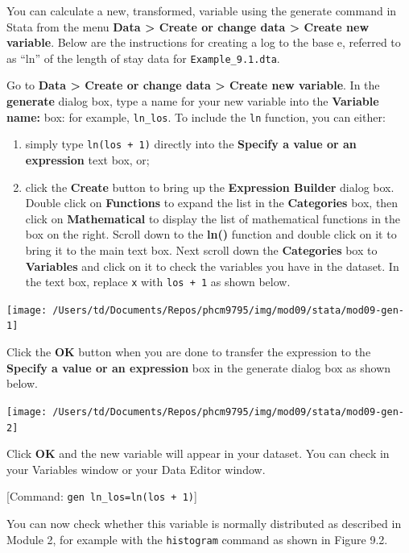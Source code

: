 \documentclass[
]{memoir}
\providecommand{\tightlist}{%
  \setlength{\itemsep}{0pt}\setlength{\parskip}{0pt}}
\begin{document}
You can calculate a new, transformed, variable using the generate command in Stata from the menu \textbf{Data \textgreater{} Create or change data \textgreater{} Create new variable}. Below are the instructions for creating a log to the base e, referred to as ``ln'' of the length of stay data for \texttt{Example\_9.1.dta}.

Go to \textbf{Data \textgreater{} Create or change data \textgreater{} Create new variable}. In the \textbf{generate} dialog box, type a name for your new variable into the \textbf{Variable name:} box: for example, \texttt{ln\_los}. To include the \texttt{ln} function, you can either:

\begin{enumerate}
\def\labelenumi{\arabic{enumi})}
\tightlist
\item
  simply type \texttt{ln(los\ +\ 1)} directly into the \textbf{Specify a value or an expression} text box, or;
\item
  click the \textbf{Create} button to bring up the \textbf{Expression Builder} dialog box. Double click on \textbf{Functions} to expand the list in the \textbf{Categories} box, then click on \textbf{Mathematical} to display the list of mathematical functions in the box on the right. Scroll down to the \textbf{ln()} function and double click on it to bring it to the main text box. Next scroll down the \textbf{Categories} box to \textbf{Variables} and click on it to check the variables you have in the dataset. In the text box, replace \texttt{x} with \texttt{los\ +\ 1} as shown below.
\end{enumerate}

\texttt{[image: /Users/td/Documents/Repos/phcm9795/img/mod09/stata/mod09-gen-1]}

Click the \textbf{OK} button when you are done to transfer the expression to the \textbf{Specify a value or an expression} box in the generate dialog box as shown below.

\texttt{[image: /Users/td/Documents/Repos/phcm9795/img/mod09/stata/mod09-gen-2]}

Click \textbf{OK} and the new variable will appear in your dataset. You can check in your Variables window or your Data Editor window.

{[}Command: \texttt{gen\ ln\_los=ln(los\ +\ 1)}{]}

You can now check whether this variable is normally distributed as described in Module 2, for example with the \texttt{histogram} command as shown in Figure 9.2.
\end{document}
